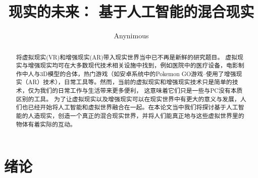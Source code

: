 \documentclass{llncs}
\begin{document}
	
\title{现实的未来： 基于人工智能的混合现实}
\author{Anynimous}
\maketitle

\begin{abstract}
将虚拟现实(VR)和增强现实(AR)带入现实世界当中已不再是新鲜的研究题目。 虚拟现实与增强现实均可在大多数现代技术相关设施中找到，例如医院中的医疗设备，电影制作中人与3D模型的合体，热门游戏（如安卓系统中的Pokemon GO游戏--使用了增强现实（AR）技术），日常工具等。然而，当前的虚拟现实和增强现实技术只是简单的技术，仅为我们的日常工作与生活带来更多便利， 这意味着它们只是一些与PC没有本质区别的工具。 为了让虚拟现实以及增强现实可以在现实世界中有更大的意义与发展，人们也已经开始将人工智能和虚拟世界融合在一起。在本论文当中我们将探讨基于人工智能的人造现实，创造一个真正的混合现实世界，并将人们能真正地与这些虚拟世界里的物体有着实际的互动。

\end{abstract}

\section{绪论}
\end{document}
